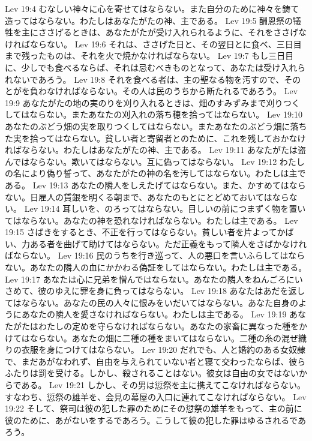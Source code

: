 Lev 19:4  むなしい神々に心を寄せてはならない。また自分のために神々を鋳て造ってはならない。わたしはあなたがたの神、主である。
Lev 19:5  酬恩祭の犠牲を主にささげるときは、あなたがたが受け入れられるように、それをささげなければならない。
Lev 19:6  それは、ささげた日と、その翌日とに食べ、三日目まで残ったものは、それを火で焼かなければならない。
Lev 19:7  もし三日目に、少しでも食べるならば、それは忌むべきものとなって、あなたは受け入れられないであろう。
Lev 19:8  それを食べる者は、主の聖なる物を汚すので、そのとがを負わなければならない。その人は民のうちから断たれるであろう。
Lev 19:9  あなたがたの地の実のりを刈り入れるときは、畑のすみずみまで刈りつくしてはならない。またあなたの刈入れの落ち穂を拾ってはならない。
Lev 19:10  あなたのぶどう畑の実を取りつくしてはならない。またあなたのぶどう畑に落ちた実を拾ってはならない。貧しい者と寄留者とのために、これを残しておかなければならない。わたしはあなたがたの神、主である。
Lev 19:11  あなたがたは盗んではならない。欺いてはならない。互に偽ってはならない。
Lev 19:12  わたしの名により偽り誓って、あなたがたの神の名を汚してはならない。わたしは主である。
Lev 19:13  あなたの隣人をしえたげてはならない。また、かすめてはならない。日雇人の賃銀を明くる朝まで、あなたのもとにとどめておいてはならない。
Lev 19:14  耳しいを、のろってはならない。目しいの前につまずく物を置いてはならない。あなたの神を恐れなければならない。わたしは主である。
Lev 19:15  さばきをするとき、不正を行ってはならない。貧しい者を片よってかばい、力ある者を曲げて助けてはならない。ただ正義をもって隣人をさばかなければならない。
Lev 19:16  民のうちを行き巡って、人の悪口を言いふらしてはならない。あなたの隣人の血にかかわる偽証をしてはならない。わたしは主である。
Lev 19:17  あなたは心に兄弟を憎んではならない。あなたの隣人をねんごろにいさめて、彼のゆえに罪を身に負ってはならない。
Lev 19:18  あなたはあだを返してはならない。あなたの民の人々に恨みをいだいてはならない。あなた自身のようにあなたの隣人を愛さなければならない。わたしは主である。
Lev 19:19  あなたがたはわたしの定めを守らなければならない。あなたの家畜に異なった種をかけてはならない。あなたの畑に二種の種をまいてはならない。二種の糸の混ぜ織りの衣服を身につけてはならない。
Lev 19:20  だれでも、人と婚約のある女奴隷で、まだあがなわれず、自由を与えられていない者と寝て交わったならば、彼らふたりは罰を受ける。しかし、殺されることはない。彼女は自由の女ではないからである。
Lev 19:21  しかし、その男は愆祭を主に携えてこなければならない。すなわち、愆祭の雄羊を、会見の幕屋の入口に連れてこなければならない。
Lev 19:22  そして、祭司は彼の犯した罪のためにその愆祭の雄羊をもって、主の前に彼のために、あがないをするであろう。こうして彼の犯した罪はゆるされるであろう。
